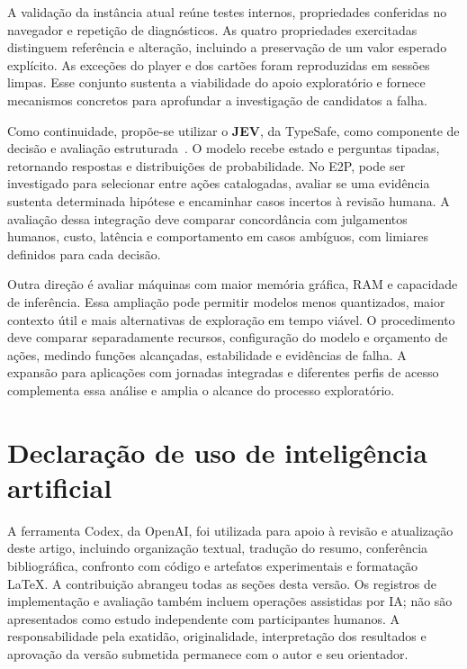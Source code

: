 \documentclass[12pt]{article}
\begin{document}
A validação da instância atual reúne testes internos, propriedades conferidas no navegador e repetição de diagnósticos. As quatro propriedades exercitadas distinguem referência e alteração, incluindo a preservação de um valor esperado explícito. As exceções do player e dos cartões foram reproduzidas em sessões limpas. Esse conjunto sustenta a viabilidade do apoio exploratório e fornece mecanismos concretos para aprofundar a investigação de candidatos a falha.

Como continuidade, propõe-se utilizar o \textbf{JEV}, da TypeSafe, como componente de decisão e avaliação estruturada~\cite{typesafe2026jev}. O modelo recebe estado e perguntas tipadas, retornando respostas e distribuições de probabilidade. No E2P, pode ser investigado para selecionar entre ações catalogadas, avaliar se uma evidência sustenta determinada hipótese e encaminhar casos incertos à revisão humana. A avaliação dessa integração deve comparar concordância com julgamentos humanos, custo, latência e comportamento em casos ambíguos, com limiares definidos para cada decisão.

Outra direção é avaliar máquinas com maior memória gráfica, RAM e capacidade de inferência. Essa ampliação pode permitir modelos menos quantizados, maior contexto útil e mais alternativas de exploração em tempo viável. O procedimento deve comparar separadamente recursos, configuração do modelo e orçamento de ações, medindo funções alcançadas, estabilidade e evidências de falha. A expansão para aplicações com jornadas integradas e diferentes perfis de acesso complementa essa análise e amplia o alcance do processo exploratório.

\section*{Declaração de uso de inteligência artificial}
A ferramenta Codex, da OpenAI, foi utilizada para apoio à revisão e atualização deste artigo, incluindo organização textual, tradução do resumo, conferência bibliográfica, confronto com código e artefatos experimentais e formatação LaTeX. A contribuição abrangeu todas as seções desta versão. Os registros de implementação e avaliação também incluem operações assistidas por IA; não são apresentados como estudo independente com participantes humanos. A responsabilidade pela exatidão, originalidade, interpretação dos resultados e aprovação da versão submetida permanece com o autor e seu orientador.



\end{document}
